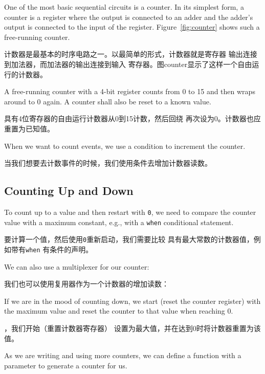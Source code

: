 \documentclass[%
    10pt,
    headinclude, footexclude,
    openright, %
    notitlepage,
    cleardoubleempty,
    headsepline,
    pointlessnumbers,
    bibtotoc, idxtotoc,
    ]{scrbook}
\newcommand{\code}[1]{{\small{\texttt{#1}}}}
\begin{document}
One of the most basic sequential circuits is a counter. In its simplest form, a counter is a register
where the output is connected to an adder and the adder's output is connected to the input
of the register. Figure~\ref{fig:counter} shows such a free-running counter.

计数器是最基本的时序电路之一。以最简单的形式，计数器就是寄存器
输出连接到加法器，而加法器的输出连接到输入
寄存器。图counter显示了这样一个自由运行的计数器。

A free-running counter with a 4-bit register counts from 0 to 15 and then wraps around
to 0 again. A counter shall also be reset to a known value.

具有4位寄存器的自由运行计数器从0到15计数，然后回绕
再次设为0。计数器也应重置为已知值。


\noindent When we want to count events, we use a condition to  increment the counter.

\noindent 当我们想要去计数事件的时候，我们使用条件去增加计数器读数。


\subsection{Counting Up and Down}

To count up to a value and then restart with \code{0}, we need to compare
the counter value with a maximum constant, e.g., with a \code{when}
conditional statement.

要计算一个值，然后使用\code{0}重新启动，我们需要比较
具有最大常数的计数器值，例如带有\code{when}
有条件的声明。


\noindent We can also use a multiplexer for our counter:

\noindent 我们也可以使用复用器作为一个计数器的增加读数：


\noindent If we are in the mood of counting down, we start (reset the counter register)
with the maximum value and reset the counter to that value when reaching 0.

，我们开始（重置计数器寄存器）
设置为最大值，并在达到0时将计数器重置为该值。


\noindent As we are writing and using more counters, we can
define a function with a parameter to generate a counter for us.
\end{document}
